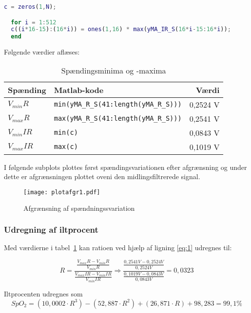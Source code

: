 \documentclass{article}
\begin{document}
\begin{lstlisting}[language=Matlab,basicstyle=\tiny]
  c = zeros(1,N);

  for i = 1:512
  c((i*16-15):(16*i)) = ones(1,16) * max(yMA_IR_S(16*i-15:16*i));
  end
\end{lstlisting}

Følgende værdier aflæses:
\begin{table}[h]
  \centering
  \begin{tabular}[h]{llr}
    \hline
    \textbf{Spænding}&\textbf{Matlab-kode}&\textbf{Værdi}\\
    \hline
    $V_{min}R$&\lstinline!min(yMA_R_S(41:length(yMA_R_S)))!&0,2524 V\\
    $V_{max}R$&\lstinline!max(yMA_R_S(41:length(yMA_R_S)))!&0,2541 V\\
    $V_{min}IR$&\lstinline!min(c)!&0,0843 V\\
    $V_{max}IR$&\lstinline!max(c)!&0,1019 V\\
    \hline
  \end{tabular}
  \caption{Spændingsminima og -maxima}
  \label{tab:vmaix}
\end{table}

I følgende subplots plottes først spændingsvariationen efter afgrænsning og under dette er afgrænsningen plottet oveni den midlingsfiltrerede signal.

\begin{figure}[h]
  \centering
  \texttt{[image: plotafgr1.pdf]}
  \caption{Afgrænsning af spændningssvariation}
  \label{fig:plotafgr1}
\end{figure}


\subsubsection{Udregning af iltprocent}
\label{sec:udregn-af-iltpr}

Med værdierne i tabel~\ref{tab:vmaix} kan ratioen ved hjælp af ligning \ref{eq:1} udregnes til:

\begin{equation}
  \label{eq:3}
  R=\frac{\frac{V_{max}R-V_{min}R}{V_{min}R}}{\frac{V_{max}IR-V_{min}IR}{V_{min}IR}}\Rightarrow  \frac{\frac{0,2541 V-0,2524 V}{0,2524 V}}{\frac{0,1019 V-0,0843 V}{0,0843 V}}=0,0323
\end{equation}

Iltprocenten udregnes som
\begin{equation}
  \label{eq:4}
  SpO_2=(10,0002\cdot R^3)-(52,887\cdot R^2)+(26,871\cdot R)+98,283=99,1\%
\end{equation}
\end{document}
